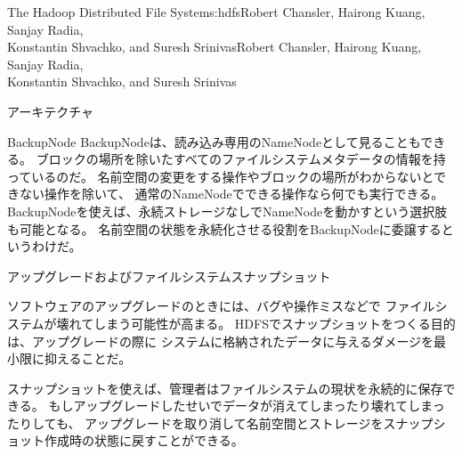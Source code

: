 \begin{aosachaptertoc}{The Hadoop Distributed File System}{s:hdfs}{Robert Chansler, Hairong Kuang, Sanjay Radia, \\ Konstantin Shvachko, and Suresh Srinivas}{Robert Chansler, Hairong Kuang, Sanjay Radia, \\ \hspace*{0.9cm} Konstantin Shvachko, and Suresh Srinivas}
\begin{aosasect1}{アーキテクチャ}
\begin{aosasect2}{BackupNode}
BackupNodeは、読み込み専用のNameNodeとして見ることもできる。
ブロックの場所を除いたすべてのファイルシステムメタデータの情報を持っているのだ。
名前空間の変更をする操作やブロックの場所がわからないとできない操作を除いて、
通常のNameNodeでできる操作なら何でも実行できる。
BackupNodeを使えば、永続ストレージなしでNameNodeを動かすという選択肢も可能となる。
名前空間の状態を永続化させる役割をBackupNodeに委譲するというわけだ。

\end{aosasect2}

\begin{aosasect2}{アップグレードおよびファイルシステムスナップショット}

ソフトウェアのアップグレードのときには、バグや操作ミスなどで
ファイルシステムが壊れてしまう可能性が高まる。
HDFSでスナップショットをつくる目的は、アップグレードの際に
システムに格納されたデータに与えるダメージを最小限に抑えることだ。

スナップショットを使えば、管理者はファイルシステムの現状を永続的に保存できる。
もしアップグレードしたせいでデータが消えてしまったり壊れてしまったりしても、
アップグレードを取り消して名前空間とストレージをスナップショット作成時の状態に戻すことができる。


\end{aosasect2}
\end{aosasect1}
\end{aosachaptertoc}
